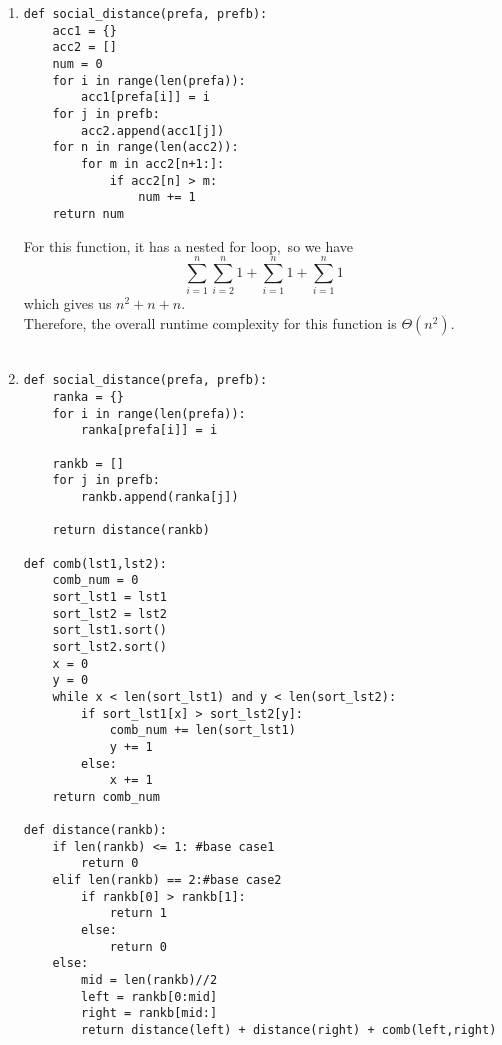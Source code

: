 \documentclass[12pt]{article}
\begin{document}
\begin{enumerate}
\item
\begin{verbatim}
def social_distance(prefa, prefb):
    acc1 = {}
    acc2 = []
    num = 0
    for i in range(len(prefa)):
        acc1[prefa[i]] = i
    for j in prefb:
        acc2.append(acc1[j])
    for n in range(len(acc2)):
        for m in acc2[n+1:]:
            if acc2[n] > m:
                num += 1
    return num
\end{verbatim}
For this function, it has a nested for loop,\ so we have $$\sum_{i=1}^{n}\sum_{i=2}^{n}1 + \sum_{i=1}^{n}1 + \sum_{i=1}^{n}1$$ which gives us $n^2 + n + n$.\\
Therefore, the overall runtime complexity for this function is $\Theta(n^2)$.\\\\
\item
\begin{verbatim}
def social_distance(prefa, prefb):
    ranka = {}
    for i in range(len(prefa)):
        ranka[prefa[i]] = i

    rankb = []
    for j in prefb:
        rankb.append(ranka[j])
        
    return distance(rankb)

def comb(lst1,lst2):
    comb_num = 0
    sort_lst1 = lst1
    sort_lst2 = lst2
    sort_lst1.sort()
    sort_lst2.sort()
    x = 0
    y = 0
    while x < len(sort_lst1) and y < len(sort_lst2):
        if sort_lst1[x] > sort_lst2[y]:
            comb_num += len(sort_lst1)
            y += 1
        else:
            x += 1
    return comb_num

def distance(rankb):
    if len(rankb) <= 1: #base case1
        return 0
    elif len(rankb) == 2:#base case2
        if rankb[0] > rankb[1]:
            return 1
        else:
            return 0
    else:
        mid = len(rankb)//2
        left = rankb[0:mid]
        right = rankb[mid:]
        return distance(left) + distance(right) + comb(left,right)


\end{verbatim}
\end{enumerate}
\end{document}
